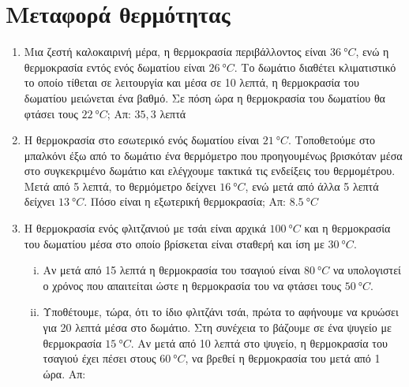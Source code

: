 \section*{Μεταφορά θερμότητας}

\begin{enumerate}

  \item Μια ζεστή καλοκαιρινή μέρα, η θερμοκρασία περιβάλλοντος είναι 
    $ \SI{36}{\degree C} $, ενώ η θερμοκρασία εντός ενός δωματίου είναι 
    $ \SI{26}{\degree C} $. Το δωμάτιο διαθέτει κλιματιστικό το οποίο τίθεται 
    σε λειτουργία και μέσα σε 10 λεπτά, η θερμοκρασία του δωματίου μειώνεται ένα βαθμό. 
    Σε πόση ώρα η θερμοκρασία του δωματίου θα φτάσει τους $ \SI{22}{\degree C} $; 
    \hfill Απ: $ 35,3 $ λεπτά 

  \item Η θερμοκρασία στο εσωτερικό ενός δωματίου είναι $ \SI{21}{\degree C} $. 
    Τοποθετούμε στο μπαλκόνι έξω από το δωμάτιο ένα θερμόμετρο που προηγουμένως 
    βρισκόταν μέσα στο συγκεκριμένο δωμάτιο και ελέγχουμε τακτικά τις ενδείξεις του 
    θερμομέτρου. Μετά από 5 λεπτά, το θερμόμετρο δείχνει $ \SI{16}{\degree C} $, 
    ενώ μετά από άλλα 5 λεπτά δείχνει $ \SI{13}{\degree C} $. 
    Πόσο είναι η εξωτερική θερμοκρασία;
    \hfill Απ: $ \SI{8,5}{\degree C} $ 

  \item Η θερμοκρασία ενός φλιτζανιού με τσάι είναι αρχικά $ \SI{100}{\degree C} $ και 
    η θερμοκρασία του δωματίου μέσα στο οποίο βρίσκεται είναι σταθερή και ίση με 
    $ \SI{30}{\degree C} $. 
    \begin{enumerate}[i)]
      \item Αν μετά από 15 λεπτά η θερμοκρασία του τσαγιού είναι $ \SI{80}{\degree C} $ 
        να υπολογιστεί ο χρόνος που απαιτείται ώστε η θερμοκρασία του να φτάσει τους 
        $ \SI{50}{\degree C} $. 
      \item Υποθέτουμε, τώρα, ότι το ίδιο φλιτζάνι τσάι, πρώτα το αφήνουμε να κρυώσει 
        για 20 λεπτά μέσα στο δωμάτιο. Στη συνέχεια το βάζουμε σε ένα ψυγείο 
        με θερμοκρασία $ \SI{15}{\degree C} $. Αν μετά από 10 λεπτά στο ψυγείο, 
        η θερμοκρασία του τσαγιού έχει πέσει στους $ \SI{60}{\degree C} $, να 
        βρεθεί η θερμοκρασία του μετά από 1 ώρα. 
        \hfill Απ: 
    \end{enumerate}
\end{enumerate}

